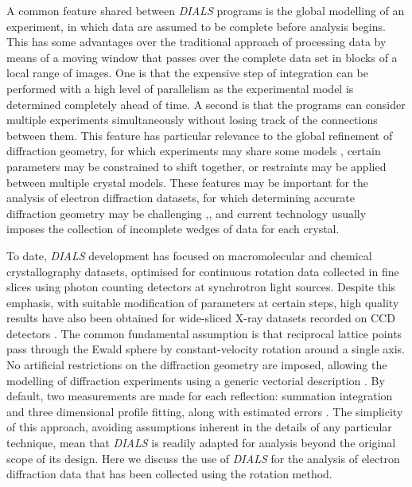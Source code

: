 \documentclass[preprint]{iucr}
\newcommand{\dials}{\emph{DIALS}\xspace}
\newcounter{DWCounter}
\newcommand{\DW}[1]{%
   \stepcounter{DWCounter}%
   {\color{red}{\textbf{DW \#\arabic{DWCounter}: }#1}}%
  }
\begin{document}
A common feature shared between \dials programs is the global modelling of an
experiment, in which data are assumed to be complete before analysis begins.
This has some advantages over the traditional approach of processing data by
means of a moving window that passes over the complete data set in blocks of a
local range of images. One is that the expensive step of integration can be
performed with a high level of parallelism as the experimental model is
determined completely ahead of time. A second is that the programs can consider
multiple experiments simultaneously without losing track of the connections
between them. This feature has particular relevance to the global refinement of
diffraction geometry, for which experiments may share some models
\cite{Waterman2016}, certain parameters may be constrained to shift together,
or restraints may be applied between multiple crystal models. These features
may be important for the analysis of electron diffraction datasets, for which
determining accurate diffraction geometry may be challenging
\cite{review_adt_red:2015},, and current
technology usually imposes the collection of incomplete wedges of data for each
crystal.

To date, \dials development has focused on macromolecular and chemical
crystallography datasets, optimised for continuous rotation data collected in
fine slices using photon counting detectors at synchrotron light sources.
Despite this emphasis, with suitable modification of parameters at certain
steps, high quality results have also been obtained for wide-sliced X-ray
datasets recorded on CCD detectors \DW{any ref for this?}. The common
fundamental assumption is that reciprocal lattice points pass through the Ewald
sphere by constant-velocity rotation around a single axis.
No artificial restrictions on the diffraction geometry are imposed, allowing the
modelling of diffraction experiments using a generic vectorial description
\cite{Waterman2016}. By default, two measurements are made for each reflection:
summation integration and three dimensional profile fitting, along with
estimated errors \cite{Winter2017}. The simplicity of this approach, avoiding
assumptions inherent in the details of any particular technique, mean that
\dials is readily adapted for analysis beyond the original scope of its design.
Here we discuss the use of \dials for the analysis of electron diffraction data
that has been collected using the rotation method.
\end{document}
